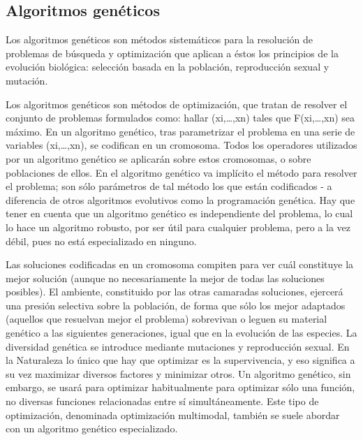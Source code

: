 \documentclass[11pt]{article}
\begin{document}
\begin{titlepage}
\subsection{Algoritmos gen\'eticos}
\label{sec-2-2}

  \label{basTeoGenet}

Los algoritmos gen\'eticos son m\'etodos sistem\'aticos para la resoluci\'on de problemas de b\'usqueda y optimizaci\'on que aplican a \'estos los principios de la evoluci\'on biol\'ogica: selecci\'on basada en la poblaci\'on, reproducci\'on sexual y mutaci\'on.

 Los algoritmos gen\'eticos son m\'etodos de optimizaci\'on, que tratan de resolver el conjunto de problemas formulados como: hallar (xi,\ldots{},xn) tales que F(xi,\ldots{},xn) sea m\'aximo. En un algoritmo gen\'etico, tras parametrizar el problema en una serie de variables (xi,\ldots{},xn), se codifican en un cromosoma. Todos los operadores utilizados por un algoritmo gen\'etico se aplicar\'an sobre estos cromosomas, o sobre poblaciones de ellos. En el algoritmo gen\'etico va impl\'icito el m\'etodo para resolver el problema; son s\'olo par\'ametros de tal m\'etodo los que est\'an codificados - a diferencia de otros algoritmos evolutivos como la programaci\'on gen\'etica. Hay que tener en cuenta que un algoritmo gen\'etico es independiente del problema, lo cual lo hace un algoritmo robusto, por ser \'util para cualquier problema, pero a la vez d\'ebil, pues no est\'a especializado en ninguno.

 Las soluciones codificadas en un cromosoma compiten para ver cu\'al constituye la mejor soluci\'on (aunque no necesariamente la mejor de todas las soluciones posibles). El ambiente, constituido por las otras camaradas soluciones, ejercer\'a una presi\'on selectiva sobre la poblaci\'on, de forma que s\'olo los mejor adaptados (aquellos que resuelvan mejor el problema) sobrevivan o leguen su material gen\'etico a las siguientes generaciones, igual que en la evoluci\'on de las especies. La diversidad gen\'etica se introduce mediante mutaciones y reproducci\'on sexual. En la Naturaleza lo \'unico que hay que optimizar es la supervivencia, y eso significa a su vez maximizar diversos factores y minimizar otros. Un algoritmo gen\'etico, sin embargo, se usar\'a para optimizar habitualmente para optimizar s\'olo una funci\'on, no diversas funciones relacionadas entre s\'i simult\'aneamente. Este tipo de optimizaci\'on, denominada optimizaci\'on multimodal, tambi\'en se suele abordar con un algoritmo gen\'etico especializado.


\end{titlepage}
\end{document}
